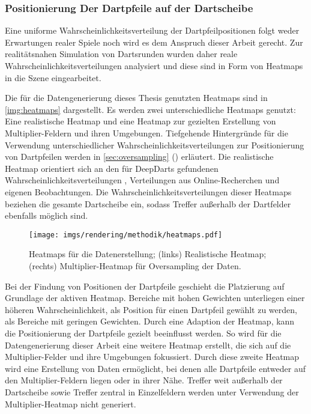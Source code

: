 \subsubsection{Positionierung Der Dartpfeile auf der Dartscheibe}
\label{sec:dartpfeil_positionierung}

Eine uniforme Wahrscheinlichkeitsverteilung der Dartpfeilpositionen folgt weder Erwartungen realer Spiele noch wird es dem Anspruch dieser Arbeit gerecht. Zur realitätsnahen Simulation von Dartsrunden wurden daher reale Wahrscheinlichkeitsverteilungen analysiert und diese sind in Form von Heatmaps in die Szene eingearbeitet.

Die für die Datengenerierung dieses Thesis genutzten Heatmaps sind in \autoref{img:heatmaps} dargestellt. Es werden zwei unterschiedliche Heatmaps genutzt: Eine realistische Heatmap und eine Heatmap zur gezielten Erstellung von Multiplier-Feldern und ihren Umgebungen. Tiefgehende Hintergründe für die Verwendung unterschiedlicher Wahrscheinlichkeitsverteilungen zur Positionierung von Dartpfeilen werden in \autoref{sec:oversampling} () erläutert. Die realistische Heatmap orientiert sich an den für DeepDarts gefundenen Wahrscheinlichkeitsverteilungen \cite{deepdarts}, Verteilungen aus Online-Recherchen \cite{heatmap} und eigenen Beobachtungen. Die Wahrscheinlichkeitsverteilungen dieser Heatmaps beziehen die gesamte Dartscheibe ein, sodass Treffer außerhalb der Dartfelder ebenfalls möglich sind.

\begin{figure}
    \centering
    \texttt{[image: imgs/rendering/methodik/heatmaps.pdf]}
    \caption{Heatmaps für die Datenerstellung; (links) Realistische Heatmap; (rechts) Multiplier-Heatmap für Oversampling der Daten.}
    \label{img:heatmaps}
\end{figure}

Bei der Findung von Positionen der Dartpfeile geschieht die Platzierung auf Grundlage der aktiven Heatmap. Bereiche mit hohen Gewichten unterliegen einer höheren Wahrscheinlichkeit, als Position für einen Dartpfeil gewählt zu werden, als Bereiche mit geringen Gewichten. Durch eine Adaption der Heatmap, kann die Positionierung der Dartpfeile gezielt beeinflusst werden. So wird für die Datengenerierung dieser Arbeit eine weitere Heatmap erstellt, die sich auf die Multiplier-Felder und ihre Umgebungen fokussiert. Durch diese zweite Heatmap wird eine Erstellung von Daten ermöglicht, bei denen alle Dartpfeile entweder auf den Multiplier-Feldern liegen oder in ihrer Nähe. Treffer weit außerhalb der Dartscheibe sowie Treffer zentral in Einzelfeldern werden unter Verwendung der Multiplier-Heatmap nicht generiert.

